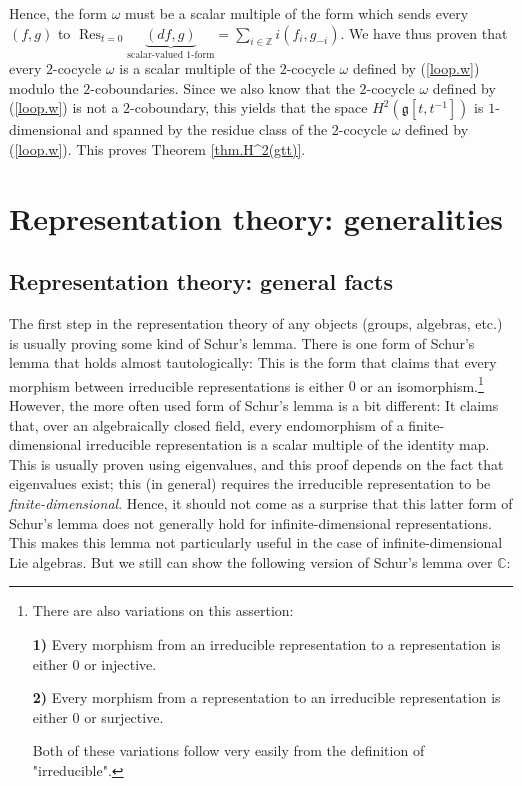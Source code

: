 \documentclass
[numbers=enddot,12pt,final,onecolumn,german,notitlepage]{scrartcl}%
\theoremstyle{definition}
\begin{document}
Hence, the form $\omega$ must be a scalar multiple of the form which sends
every $\left(  f,g\right)  $ to $\operatorname*{Res}\nolimits_{t=0}%
\underbrace{\left(  df,g\right)  }_{\text{scalar-valued }1\text{-form}}%
=\sum\limits_{i\in\mathbb{Z}}i\left(  f_{i},g_{-i}\right)  $. We have thus
proven that every $2$-cocycle $\omega$ is a scalar multiple of the $2$-cocycle
$\omega$ defined by (\ref{loop.w}) modulo the $2$-coboundaries. Since we also
know that the $2$-cocycle $\omega$ defined by (\ref{loop.w}) is not a
$2$-coboundary, this yields that the space $H^{2}\left(  \mathfrak{g}\left[
t,t^{-1}\right]  \right)  $ is $1$-dimensional and spanned by the residue
class of the $2$-cocycle $\omega$ defined by (\ref{loop.w}). This proves
Theorem \ref{thm.H^2(gtt)}.

\section{Representation theory: generalities}

\subsection{Representation theory: general facts}

The first step in the representation theory of any objects (groups, algebras,
etc.) is usually proving some kind of Schur's lemma. There is one form of
Schur's lemma that holds almost tautologically: This is the form that claims
that every morphism between irreducible representations is either $0$ or an
isomorphism.\footnote{There are also variations on this assertion:
\par
\textbf{1)} Every morphism from an irreducible representation to a
representation is either $0$ or injective.
\par
\textbf{2)} Every morphism from a representation to an irreducible
representation is either $0$ or surjective.
\par
Both of these variations follow very easily from the definition of
"irreducible".} However, the more often used form of Schur's lemma is a bit
different: It claims that, over an algebraically closed field, every
endomorphism of a finite-dimensional irreducible representation is a scalar
multiple of the identity map. This is usually proven using eigenvalues, and
this proof depends on the fact that eigenvalues exist; this (in general)
requires the irreducible representation to be \textit{finite-dimensional}.
Hence, it should not come as a surprise that this latter form of Schur's lemma
does not generally hold for infinite-dimensional representations. This makes
this lemma not particularly useful in the case of infinite-dimensional Lie
algebras. But we still can show the following version of Schur's lemma over
$\mathbb{C}$:
\end{document}
